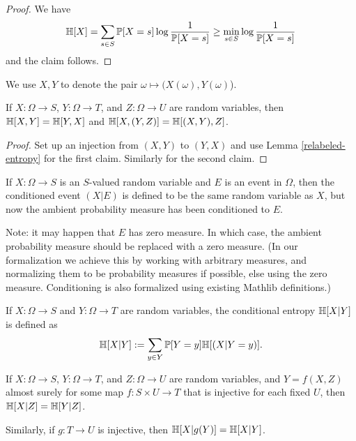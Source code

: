 \begin{proof}
  We have
  $$ \mathbb{H}[X] = \sum_{s \in S} \mathbb{P}[X=s] \log \frac{1}{\mathbb{P}[X=s]} \geq \min_{s \in S} \log \frac{1}{\mathbb{P}[X=s]}$$
  and the claim follows.
\end{proof}

We use $X,Y$ to denote the pair $\omega \mapsto (X(\omega),Y(\omega)$).

\begin{lemma}
  \label{entropy-comm}
  \leanok
  If $X: \Omega \to S$, $Y: \Omega \to T$, and $Z: \Omega \to U$ are random variables, then $\mathbb{H}[X, Y] = \mathbb{H}[Y, X]$ and $\mathbb{H}[X, (Y,Z)] = \mathbb{H}[(X,Y), Z]$.
\end{lemma}
\begin{proof}
  \leanok
  Set up an injection from $(X,Y)$ to $(Y,X)$ and use Lemma \ref{relabeled-entropy} for the first claim. Similarly for the second claim.
\end{proof}


\begin{definition}
  \label{condition-event-def}
  \leanok
  If $X: \Omega \to S$ is an $S$-valued random variable and $E$ is an event in $\Omega$, then the conditioned event $(X|E)$ is defined to be the same random variable as $X$, but now the ambient probability measure has been conditioned to $E$.
\end{definition}

Note: it may happen that $E$ has zero measure.  In which case, the ambient probability measure should be replaced with a zero measure.  (In our formalization we achieve this by working with arbitrary measures, and normalizing them to be probability measures if possible, else using the zero measure.  Conditioning is also formalized using existing Mathlib definitions.)

\begin{definition}
  \label{conditional-entropy-def}
  \leanok
  If $X: \Omega \to S$ and $Y: \Omega \to T$ are random variables, the conditional entropy $\mathbb{H}[X|Y]$ is defined as
  $$ \mathbb{H}[X|Y] := \sum_{y \in Y} \mathbb{P}[Y = y] \mathbb{H}[(X | Y=y)].$$
\end{definition}

\begin{lemma}\label{relabeled-entropy-cond}
  \leanok
  If $X: \Omega \to S$, $Y: \Omega \to T$, and $Z: \Omega \to U$ are random variables, and $Y = f(X,Z)$ almost surely for some map $f: S \times U \to T$ that is injective for each fixed $U$, then $\mathbb{H}[X|Z] = \mathbb{H}[Y|Z]$.

  Similarly, if $g: T \to U$ is injective, then $\mathbb{H}[X|g(Y)] = \mathbb{H}[X|Y]$.
\end{lemma}


